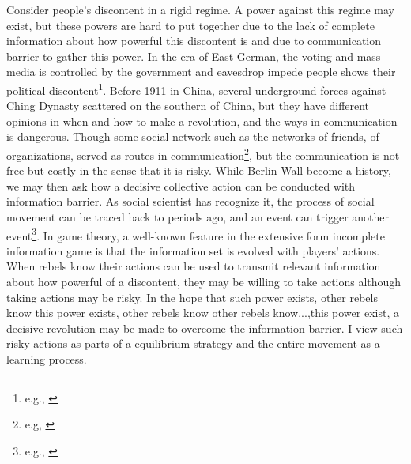 \documentclass[12pt,letter]{article}
\theoremstyle{definition}
\theoremstyle{remark}
\theoremstyle{claim}
\begin{document}
Consider people's discontent in a rigid regime. A power against this regime may exist, but these powers are hard to put together due to the lack of complete information about how powerful this discontent is and due to communication barrier to gather this power. In the era of East German, the voting and mass media is controlled by the government and eavesdrop impede people shows their political discontent\footnote{e.g., \citep{Lohmann2011}}. Before 1911 in China, several underground forces against Ching Dynasty scattered on the southern of China, but they have different opinions in when and how to make a revolution, and the ways in communication is dangerous. Though some social network such as the networks of friends, of organizations, served as routes in communication\footnote{e.g, \citep{Karl-Dieter1993}}, but the communication is not free but costly in the sense that it is risky. While Berlin Wall become a history, we may then ask how a decisive collective action can be conducted with information barrier. As social scientist has recognize it, the process of social movement can be traced back to periods ago, and an event can trigger another event\footnote{e.g., \citep{McAdamDoung;TarrowSidney;Tilly2001} \citep{McAdam2003} \citep{Lohmann2011}}. In game theory, a well-known feature in the extensive form incomplete information game is that the information set is evolved with players' actions. When rebels know their actions can be used to transmit relevant information about how powerful of a discontent, they may be willing to take actions although taking actions may be risky. In the hope that such power exists, other rebels know this power exists, other rebels know other rebels know...,this power exist, a decisive revolution may be made to overcome the information barrier. I view such risky actions as parts of a equilibrium strategy and the entire movement as a learning process. 
\end{document}
